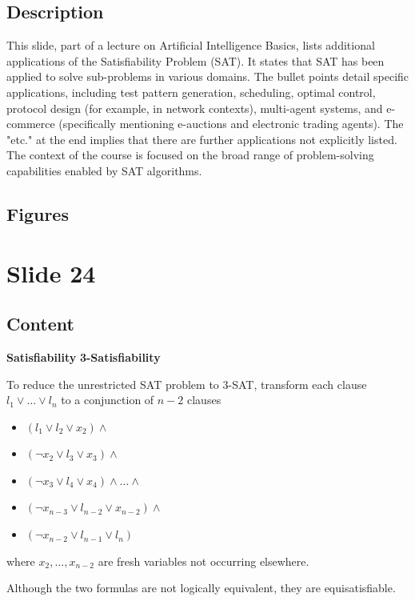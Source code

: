 \documentclass{article}%
\begin{document}
\subsection{Description}%
This slide, part of a lecture on Artificial Intelligence Basics, lists additional applications of the Satisfiability Problem (SAT).  It states that SAT has been applied to solve sub-problems in various domains.  The bullet points detail specific applications, including test pattern generation, scheduling, optimal control, protocol design (for example, in network contexts), multi-agent systems, and e-commerce (specifically mentioning e-auctions and electronic trading agents).  The "etc." at the end implies that there are further applications not explicitly listed.  The context of the course is focused on the broad range of problem-solving capabilities enabled by SAT algorithms.%
\subsection{Figures}%
\begin{figure}[H]%
\centering%
\end{figure}

%
\newpage%
\section{Slide 24}%
\label{sec:Slide24}%
\subsection{Content}%

\textbf{Satisfiability} \implies \textbf{3-Satisfiability}

To reduce the unrestricted SAT problem to 3-SAT, transform each clause $l_1 \vee \dots \vee l_n$ to a conjunction of $n-2$ clauses
\begin{itemize}
    \item $(l_1 \vee l_2 \vee x_2) \land$
    \item $(\neg x_2 \vee l_3 \vee x_3) \land$
    \item $(\neg x_3 \vee l_4 \vee x_4) \land \dots \land$
    \item $(\neg x_{n-3} \vee l_{n-2} \vee x_{n-2}) \land$
    \item $(\neg x_{n-2} \vee l_{n-1} \vee l_n)$
\end{itemize}
where $x_2, \dots, x_{n-2}$ are fresh variables not occurring elsewhere.

Although the two formulas are not logically equivalent, they are equisatisfiable.
\end{document}
